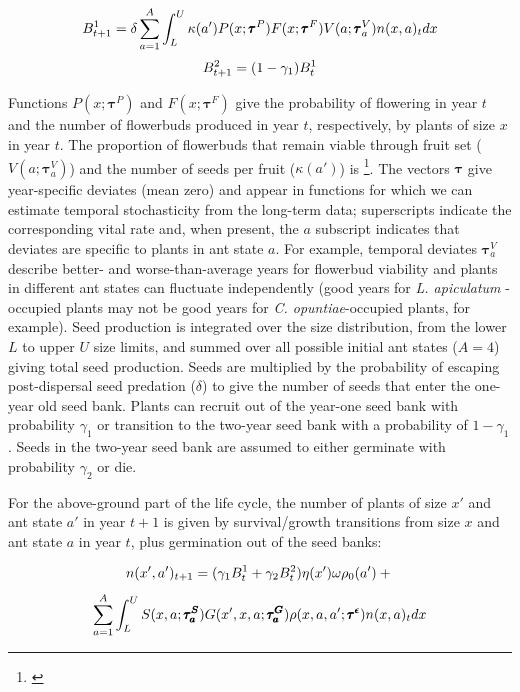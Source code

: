\documentclass[11pt]{article}
\newcommand{\tom}[2]{{\color{red}{#1}}\footnote{\textit{\color{red}{#2}}}}
\begin{document}
\begin{linenomath*}
	$$
	B^1_{t+1} = \delta \sum_{a=1}^{A} \int_L^U  \kappa(a') P(x;\pmb{\tau}^P) F(x;\pmb{\tau}^F) V(a;\pmb{\tau}^V_{a}) n(x,a)_{t} dx \\
	$$
	$$
	B^2_{t+1} =  (1 - \gamma_1)B^1_{t}\\
	$$
	\label{eqn:IPM1}
\end{linenomath*}

\noindent %
Functions $P(x;\pmb{\tau}^P)$ and $F(x;\pmb{\tau}^F)$ give the probability of flowering in year $t$ and the number of flowerbuds produced in year $t$, respectively, by plants of size $x$ in year $t$. 
The proportion of flowerbuds that remain viable through fruit set ($V(a;\pmb{\tau}^V_{a})$) and the number of seeds per fruit ($\kappa(a')$) is \tom{dependent on ant state $a$}{The text says ant state $a$ but the notation here and in the equation shows ant state $a'$. Which is it? (Should be $a$.)}. 
The vectors $\pmb{\tau}$ give year-specific deviates (mean zero) and appear in functions for which we can estimate temporal stochasticity from the long-term data; superscripts indicate the corresponding vital rate and, when present, the $a$ subscript indicates that deviates are specific to plants in ant state $a$.
For example, temporal deviates $\pmb{\tau}^V_{a}$ describe better- and worse-than-average years for flowerbud viability and plants in different ant states can fluctuate independently (good years for \textit{L. apiculatum} -occupied plants may not be good years for \textit{C. opuntiae}-occupied plants, for example). 
Seed production is integrated over the size distribution, from the lower $L$ to upper $U$ size limits, and summed over all possible initial ant states ($A=4$) giving total seed production. 
Seeds are multiplied by the probability of escaping post-dispersal seed predation ($\delta$) to give the number of seeds that enter the one-year old seed bank. 
Plants can recruit out of the year-one seed bank with probability $\gamma_1$ or transition to the two-year seed bank with a probability of $1 - \gamma_1$. 
Seeds in the two-year seed bank are assumed to either germinate with probability $\gamma_2$ or die. 

For the above-ground part of the life cycle, the number of plants of size $x'$ and ant state $a'$ in year $t+1$ is given by survival/growth transitions from size $x$ and ant state $a$ in year $t$, plus germination out of the seed banks:
\begin{linenomath*}
	$$
	n(x',a')_{t+1} = (\gamma_1 B^1_{t} + \gamma_2 B^2_{t} ) \eta(x') \omega \rho_{0}(a')  + \\
	$$
	$$
	\sum_{a=1}^{A} \int_L^U S(x,a;\pmb{\tau^S_{a}}) G(x',x,a;\pmb{\tau^G_{a}}) \rho(x,a,a';\pmb{\tau^{\epsilon}}) n(x,a)_t dx \\
	$$
	\label{eqn:IPM2}
\end{linenomath*}
\end{document}
